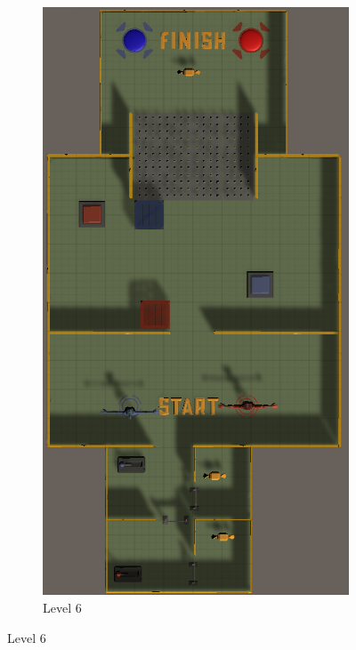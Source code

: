 \newpage
\begin{figure}[h!]
    \centering    
    \begin{subfigure}[b]{0.45\linewidth}
        \includegraphics[width=\linewidth]{images/level_6.png}
        \caption{Level 6}
        \label{fig:level 6}
      \end{subfigure}

\end{figure}
